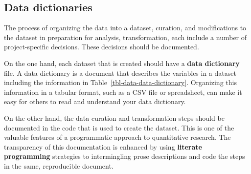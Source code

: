 \documentclass[
  letterpaper,
  krantz1]{latex/krantz-mod}
\theoremstyle{definition}
\theoremstyle{definition}
\theoremstyle{remark}
\begin{document}
\subsection{Data dictionaries}\label{sec-data-data-dictionaries}

The process of organizing the data into a dataset, curation, and
modifications to the dataset in preparation for analysis,
transformation, each include a number of project-specific decisions.
These decisions should be documented.

On the one hand, each dataset that is created should have a \textbf{data
dictionary} file. A data dictionary is a document
that describes the variables in a dataset including the information in
Table~\ref{tbl-data-data-dictionary}. Organizing this information in a
tabular format, such as a CSV file
or spreadsheet, can make it easy for others to
read and understand your data dictionary.

On the other hand, the data curation and transformation steps should be
documented in the code that is used to create the dataset. This is one
of the valuable features of a programmatic approach to quantitative
research. The transparency of this documentation is enhanced by using
\textbf{literate programming} strategies to
intermingling prose descriptions and code the steps in the same,
reproducible document.
\end{document}
